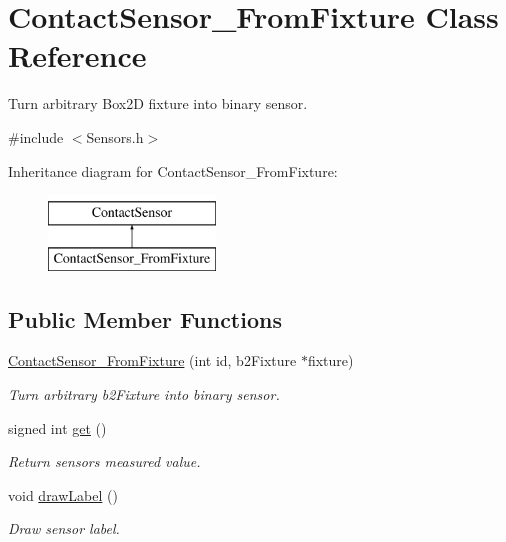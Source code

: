 \hypertarget{classContactSensor__FromFixture}{\section{Contact\-Sensor\-\_\-\-From\-Fixture Class Reference}
\label{classContactSensor__FromFixture}
}


Turn arbitrary Box2\-D fixture into binary sensor.  




{\ttfamily \#include $<$Sensors.\-h$>$}

Inheritance diagram for Contact\-Sensor\-\_\-\-From\-Fixture\-:\begin{figure}[H]
\begin{center}
\leavevmode
\includegraphics[height=2.000000cm]{classContactSensor__FromFixture}
\end{center}
\end{figure}
\subsection*{Public Member Functions}
\begin{DoxyCompactItemize}
\item 
\hyperlink{classContactSensor__FromFixture_a9989b5549cef639368089acfe5dcdfe6}{Contact\-Sensor\-\_\-\-From\-Fixture} (int id, b2\-Fixture $\ast$fixture)
\begin{DoxyCompactList}\small\item\em Turn arbitrary b2\-Fixture into binary sensor. \end{DoxyCompactList}\item 
signed int \hyperlink{classContactSensor__FromFixture_a565839762b4c6bff70f3d7d959813580}{get} ()
\begin{DoxyCompactList}\small\item\em Return sensors measured value. \end{DoxyCompactList}\item 
void \hyperlink{classContactSensor__FromFixture_ab022c55f6ffa92709062d4be3a6c584b}{draw\-Label} ()
\begin{DoxyCompactList}\small\item\em Draw sensor label. \end{DoxyCompactList}\end{DoxyCompactItemize}
